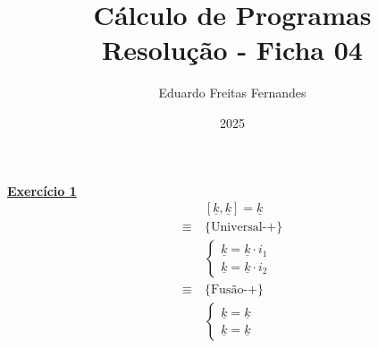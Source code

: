 \documentclass[a4paper,11pt]{article}
\title{Cálculo de Programas \\ Resolução - Ficha 04}
\author{Eduardo Freitas Fernandes}
\date{2025}
\begin{document}
	
	\maketitle
	
	\noindent \underline{\textbf{Exercício 1}}\\
	\[
	\begin{aligned}
		&[\underline{k}, \underline{k}] = \underline{k} \\
		\equiv \  &\{\text{Universal-+}\}\\
		&\begin{cases}
			\underline{k} = \underline{k} \cdot i_1 \\
			\underline{k} = \underline{k} \cdot i_2
		\end{cases}\\
		\equiv \  &\{\text{Fusão-+}\}\\
		&\begin{cases}
			\underline{k} = \underline{k} \\
			\underline{k} = \underline{k}
		\end{cases}
	\end{aligned}
	\]
	
\end{document}
